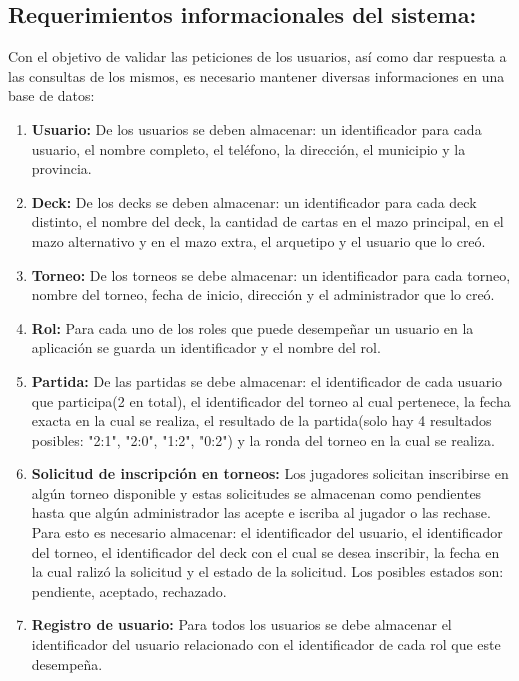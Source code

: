 \documentclass[a4paper]{article}
\begin{document}
\subsection{Requerimientos informacionales del sistema:}
Con el objetivo de validar las peticiones de los usuarios, as\'i como dar respuesta a las consultas de los mismos, es necesario mantener diversas informaciones en una base de datos:
\begin{enumerate}
	\item \textbf{Usuario:} De los usuarios se deben almacenar: un identificador para cada usuario, el nombre completo, el tel\'efono, la direcci\'on, el municipio y la provincia.
	\item \textbf{Deck:} De los decks se deben almacenar: un identificador para cada deck distinto, el nombre del deck, la cantidad de cartas en el mazo principal, en el mazo alternativo y en el mazo extra, el arquetipo y el usuario que lo cre\'o.
	\item \textbf{Torneo:} De los torneos se debe almacenar: un identificador para cada torneo, nombre del torneo, fecha de inicio, direcci\'on y el administrador que lo cre\'o.
	\item \textbf{Rol:} Para cada uno de los roles que puede desempe\~nar un usuario en la aplicaci\'on se guarda un identificador y el nombre del rol.
	\item \textbf{Partida:} De las partidas se debe almacenar: el identificador de cada usuario que participa(2 en total), el identificador del torneo al cual pertenece, la fecha exacta en la cual se realiza, el resultado de la partida(solo hay 4 resultados posibles: "2:1", "2:0", "1:2", "0:2") y la ronda del torneo en la cual se realiza.
	\item \textbf{Solicitud de inscripci\'on en torneos:} Los jugadores solicitan inscribirse en alg\'un torneo disponible y estas solicitudes se almacenan como pendientes hasta que alg\'un administrador las acepte e iscriba al jugador o las rechase. Para esto es necesario almacenar: el identificador del usuario, el identificador del torneo, el identificador del deck con el cual se desea inscribir, la fecha en la cual raliz\'o la solicitud y el estado de la solicitud. Los posibles estados son: pendiente, aceptado, rechazado.
	\item \textbf{Registro de usuario:} Para todos los usuarios se debe almacenar el identificador del usuario relacionado con el identificador de cada rol que este desempe\~na.
\end{enumerate} 
\newpage
\end{document}
